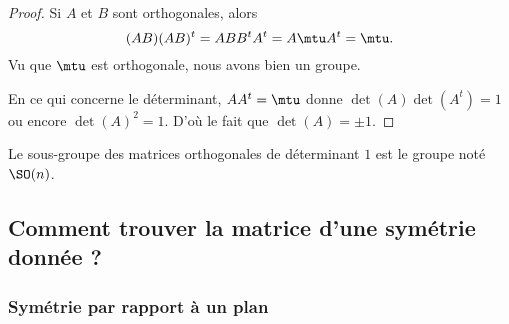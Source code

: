\begin{proof}
    Si \( A\) et \( B\) sont orthogonales, alors
    \begin{equation}
        (AB)(AB)^t=ABB^tA^t=A\mtu A^t=\mtu.
    \end{equation}
    Vu que \( \mtu\) est orthogonale, nous avons bien un groupe.

    En ce qui concerne le déterminant, \( AA^t=\mtu\) donne \( \det(A)\det(A^t)=1\) ou encore \( \det(A)^2=1\). D'où le fait que \( \det(A)=\pm 1\).
\end{proof}

Le sous-groupe des matrices orthogonales de déterminant \( 1\) est le groupe  noté \( \SO(n)\).

\subsection{Comment trouver la matrice d'une symétrie donnée ?}
\label{SubSecMtrSym}

\subsubsection{Symétrie par rapport à un plan}

